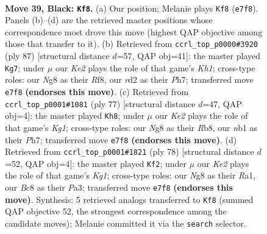 \documentclass[11pt]{article}
\begin{document}
\clearpage

\begin{figure}[p]\centering
\begin{subfigure}{0.46\textwidth}\centering
\resizebox{\linewidth}{!}{%
\newchessgame
\chessboard[
  setfen={r1b3n1/2p1k1bR/p1p5/8/8/8/3R4/1NB1K3 b - - 4 39},
  showmover=false,
  pgfstyle=straightmove, color=movearrow, markmove={e7-f8}
]}
\caption{}
\end{subfigure}\hfill
\begin{subfigure}{0.46\textwidth}\centering
\resizebox{\linewidth}{!}{%
\newchessgame
\chessboard[
  setfen={5r1k/7p/5b2/1B3R2/6Pp/4p3/2P3K1/8 b - - 0 44},
  showmover=false,
  pgfstyle=straightmove, color=movearrow, markmove={h8-g7}
]}
\caption{}
\end{subfigure}
\\[4pt]
\begin{subfigure}{0.46\textwidth}\centering
\resizebox{\linewidth}{!}{%
\newchessgame
\chessboard[
  setfen={1r4k1/2RR3p/4Bbb1/8/1p6/7P/6K1/8 b - - 8 39},
  showmover=false,
  pgfstyle=straightmove, color=movearrow, markmove={g8-h8}
]}
\caption{}
\end{subfigure}\hfill
\begin{subfigure}{0.46\textwidth}\centering
\resizebox{\linewidth}{!}{%
\newchessgame
\chessboard[
  setfen={8/5k2/p6p/6r1/3B4/P1P2b1P/8/R5K1 w - - 3 40},
  showmover=false,
  pgfstyle=straightmove, color=movearrow, markmove={g1-f2}
]}
\caption{}
\end{subfigure}
\caption{\textbf{Move 39, Black: \texttt{Kf8}.} (a) Our position; Melanie plays \texttt{Kf8} (\texttt{e7f8}). Panels (b)--(d) are the retrieved master positions whose correspondence most drove this move (highest QAP objective among those that transfer to it). (b) Retrieved from \texttt{ccrl\_top\_p0000\#3920} (ply 87) [structural distance $d$=57, QAP obj=41]: the master played \texttt{Kg7}; under $\mu$ our \emph{Ke2} plays the role of that game's \emph{Kh1}; cross-type roles: our \emph{N}g8 as their \emph{R}f8, our \emph{r}d2 as their \emph{P}h7; transferred move \texttt{e7f8} \textbf{(endorses this move)}. (c) Retrieved from \texttt{ccrl\_top\_p0001\#1081} (ply 77) [structural distance $d$=47, QAP obj=4]: the master played \texttt{Kh8}; under $\mu$ our \emph{Ke2} plays the role of that game's \emph{Kg1}; cross-type roles: our \emph{N}g8 as their \emph{R}b8, our \emph{n}b1 as their \emph{P}h7; transferred move \texttt{e7f8} \textbf{(endorses this move)}. (d) Retrieved from \texttt{ccrl\_top\_p0001\#1821} (ply 78) [structural distance $d$=52, QAP obj=4]: the master played \texttt{Kf2}; under $\mu$ our \emph{Ke2} plays the role of that game's \emph{Kg1}; cross-type roles: our \emph{N}g8 as their \emph{R}a1, our \emph{B}c8 as their \emph{P}a3; transferred move \texttt{e7f8} \textbf{(endorses this move)}. Synthesis: 5 retrieved analogs transferred to \texttt{Kf8} (summed QAP objective 52, the strongest correspondence among the candidate moves); Melanie committed it via the \texttt{search} selector.}
\label{fig:thought-m77}
\end{figure}
\end{document}
